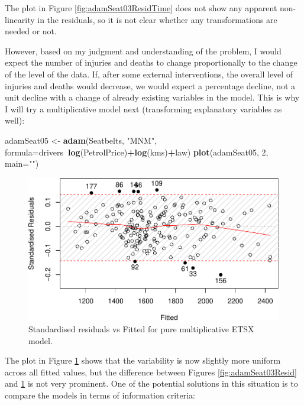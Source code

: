 \documentclass[]{book}
\newenvironment{Shaded}{\begin{snugshade}}{\end{snugshade}}
\newcommand{\DataTypeTok}[1]{\textcolor[rgb]{0.13,0.29,0.53}{#1}}
\newcommand{\DecValTok}[1]{\textcolor[rgb]{0.00,0.00,0.81}{#1}}
\newcommand{\KeywordTok}[1]{\textcolor[rgb]{0.13,0.29,0.53}{\textbf{#1}}}
\newcommand{\NormalTok}[1]{#1}
\newcommand{\OperatorTok}[1]{\textcolor[rgb]{0.81,0.36,0.00}{\textbf{#1}}}
\newcommand{\StringTok}[1]{\textcolor[rgb]{0.31,0.60,0.02}{#1}}
\theoremstyle{definition}
\theoremstyle{definition}
\theoremstyle{definition}
\theoremstyle{definition}
\theoremstyle{remark}
\begin{document}
The plot in Figure \ref{fig:adamSeat03ResidTime} does not show any apparent non-linearity in the residuals, so it is not clear whether any transformations are needed or not.

However, based on my judgment and understanding of the problem, I would expect the number of injuries and deaths to change proportionally to the change of the level of the data. If, after some external interventions, the overall level of injuries and deaths would decrease, we would expect a percentage decline, not a unit decline with a change of already existing variables in the model. This is why I will try a multiplicative model next (transforming explanatory variables as well):

\begin{Shaded}
\begin{Highlighting}[]
\NormalTok{adamSeat05 <-}\StringTok{ }\KeywordTok{adam}\NormalTok{(Seatbelts, }\StringTok{"MNM"}\NormalTok{,}
                   \DataTypeTok{formula=}\NormalTok{drivers}\OperatorTok{~}\KeywordTok{log}\NormalTok{(PetrolPrice)}\OperatorTok{+}\KeywordTok{log}\NormalTok{(kms)}\OperatorTok{+}\NormalTok{law)}
\KeywordTok{plot}\NormalTok{(adamSeat05, }\DecValTok{2}\NormalTok{, }\DataTypeTok{main=}\StringTok{""}\NormalTok{)}
\end{Highlighting}
\end{Shaded}

\begin{figure}
\centering
\includegraphics{Svetunkov--2022----ADAM_files/figure-latex/adamSeat05Resid-1.pdf}
\caption{\label{fig:adamSeat05Resid}Standardised residuals vs Fitted for pure multiplicative ETSX model.}
\end{figure}

The plot in Figure \ref{fig:adamSeat05Resid} shows that the variability is now slightly more uniform across all fitted values, but the difference between Figures \ref{fig:adamSeat03Resid} and \ref{fig:adamSeat05Resid} is not very prominent. One of the potential solutions in this situation is to compare the models in terms of information criteria:
\end{document}
